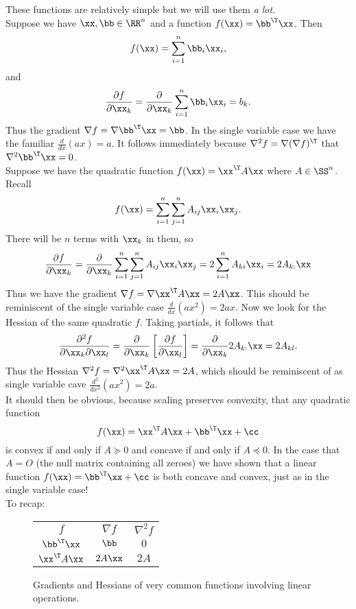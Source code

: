 \documentclass{article}
\begin{document}
These functions are relatively simple but we will use them \textit{a lot}.\\
Suppose we have $\xx,\bb\in\RR^n$ and a function $f(\xx) = \bb^\T\xx$.
Then
\[
    f(\xx) = \sum_{i=1}^n \bb_i\xx_i,
\]
and
\[
    \frac{\partial f}{\partial \xx_k} = \frac{\partial}{\partial \xx_k} \sum_{i=1}^n \bb_i\xx_i = b_k.
\]
Thus the gradient $\nabla f = \nabla \bb^\T\xx = \bb$. In the single variable case
we have the familiar $\frac{d}{dx}(ax) = a$. It follows immediately because $\nabla^2 f
= \nabla (\nabla f)^\T$ that $\nabla^2 \bb^\T\xx = 0$.\\

Suppose we have the quadratic function $f(\xx) = \xx^\T A\xx$ where $A\in\SS^n$. Recall
\[
    f(\xx) = \sum_{i=1}^n\sum_{j=1}^n A_{ij}\xx_i\xx_j.
\]
There will be $n$ terms with $\xx_k$ in them, so
\[
    \frac{\partial f}{\partial \xx_k} = \frac{\partial}{\partial \xx_k} \sum_{i=1}^n\sum_{j=1}^n A_{ij}\xx_i\xx_j = 2\sum_{i=1}^nA_{ki}\xx_i = 2A_{k:}\xx
\]
Thus we have the gradient $\nabla f = \nabla \xx^\T A\xx = 2A\xx$. This should be reminiscent
of the single variable case $\frac{d}{dx}(ax^2) = 2ax$. Now we look for the Hessian of the
same quadratic $f$. Taking partials, it follows that
\[
    \frac{\partial^2 f}{\partial \xx_k\partial \xx_l} = \frac{\partial}{\partial \xx_k}\left[ \frac{\partial f}{\partial \xx_l} \right] = \frac{\partial}{\partial \xx_k} 2A_{k:}\xx = 2A_{kl}.
\]
Thus the Hessian $\nabla^2 f = \nabla^2 \xx^\T A\xx = 2A$, which should be reminiscent of
as single variable cave $\frac{d^2}{dx^2}(ax^2) = 2a$.\\

It should then be obvious, because scaling preserves convexity, that any quadratic function
\[
    f(\xx) = \xx^\T A\xx + \bb^\T\xx + \cc
\]
is convex if and only if $A \succeq 0$ and concave if and only if $A \preceq 0$. In the case
that $A=O$ (the null matrix containing all zeroes) we have shown that a linear function
$f(\xx) = \bb^\T\xx + \cc$ is both concave and convex, just as in the single variable case!\\

To recap:
\begin{figure}[htpb]
    \centering
    \begin{tabular}{c|c|c}
        $f$ & $\nabla f$ & $\nabla^2 f$\\
        $\bb^\T\xx$ & $\bb$ & $0$\\
        $\xx^\T A\xx$ & $2A\xx$ & $2A$
    \end{tabular}
    \caption{Gradients and Hessians of very common functions
    involving linear operations.}
    \label{table:derivs}
\end{figure}
\end{document}
